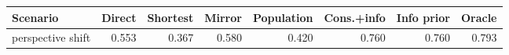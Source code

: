 \begin{tabular}{lrrrrrrr}
\toprule
Scenario & Direct & Shortest & Mirror & Population & Cons.+info & Info prior & Oracle \\
\midrule
perspective shift & 0.553 & 0.367 & 0.580 & 0.420 & 0.760 & 0.760 & 0.793 \\
\bottomrule
\end{tabular}
